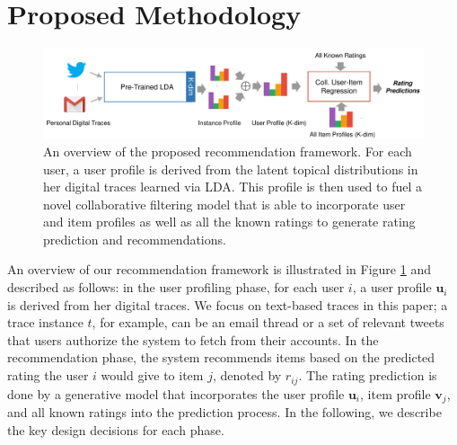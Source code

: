 \documentclass[conference]{IEEEtran}
\begin{document}



\section{Proposed Methodology}

\begin{figure}[!t]
\centering
\includegraphics[width=.95\textwidth]{images/overview}
\caption{An overview of the proposed recommendation framework. For each user, a user profile is derived from the latent topical distributions in her digital traces learned via LDA. This profile is then used to fuel a novel collaborative filtering model that is able to incorporate user and item profiles as well as all the known ratings to generate rating prediction and recommendations.}
\label{fig:overview}
\end{figure}

An overview of our recommendation framework is illustrated in Figure \ref{fig:overview} and described as follows: in the user profiling phase, for each user $i$, a user profile $\mathbf{u}_i$ is derived from her digital traces. We focus on text-based traces in this paper; a trace instance $t$, for example, can be an email thread or a set of relevant tweets that users authorize the system to fetch from their accounts. In the recommendation phase, the system recommends items based on the predicted rating the user $i$ would give to item $j$, denoted by $\hat{r}_{ij}$. The rating prediction is done by a generative model that incorporates the user profile $\mathbf{u}_i$, item profile $\mathbf{v}_j$, and all known ratings into the prediction process. In the following, we describe the key design decisions for each phase.
\end{document}
